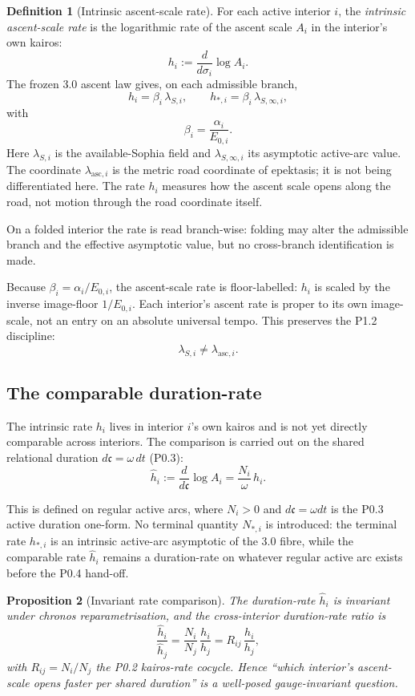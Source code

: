 \documentclass[11pt,a4paper]{article}
\theoremstyle{definition}
\newtheorem{definition}{Definition}[section]
\theoremstyle{plain}
\newtheorem{proposition}[definition]{Proposition}
\theoremstyle{remark}
\begin{document}
\begin{definition}[Intrinsic ascent-scale rate]\label{def:rate}
For each active interior \(i\), the \emph{intrinsic ascent-scale rate} is the
logarithmic rate of the ascent scale \(A_i\) in the interior's own kairos:
\[
\boxed{\;
h_i
:=
\frac{d}{d\sigma_i}\log A_i.
\;}
\]
The frozen 3.0 ascent law gives, on each admissible branch,
\[
\boxed{\;
h_i=\beta_i\,\lambda_{S,i},
\qquad
h_{*,i}=\beta_i\,\lambda_{S,\infty,i},
\;}
\]
with
\[
\beta_i=\frac{\alpha_i}{E_{0,i}}.
\]
Here \(\lambda_{S,i}\) is the available-Sophia field and
\(\lambda_{S,\infty,i}\) its asymptotic active-arc value. The coordinate
\(\lambda_{\mathrm{asc},i}\) is the metric road coordinate of epektasis; it is not
being differentiated here. The rate \(h_i\) measures how the ascent scale opens
along the road, not motion through the road coordinate itself.

On a folded interior the rate is read branch-wise: folding may alter the
admissible branch and the effective asymptotic value, but no cross-branch
identification is made.
\end{definition}

Because \(\beta_i=\alpha_i/E_{0,i}\), the ascent-scale rate is floor-labelled:
\(h_i\) is scaled by the inverse image-floor \(1/E_{0,i}\). Each interior's ascent
rate is proper to its own image-scale, not an entry on an absolute universal tempo.
This preserves the P1.2 discipline:
\[
\lambda_{S,i}\neq\lambda_{\mathrm{asc},i}.
\]

\subsection{The comparable duration-rate}

The intrinsic rate \(h_i\) lives in interior \(i\)'s own kairos and is not yet directly
comparable across interiors. The comparison is carried out on the shared relational
duration \(d\mathfrak c=\omega\,dt\) (P0.3):
\[
\boxed{\;
\hat h_i
:=
\frac{d}{d\mathfrak c}\log A_i
=
\frac{N_i}{\omega}\,h_i.
\;}
\]

This is defined on regular active arcs, where \(N_i>0\) and
\(d\mathfrak c=\omega dt\) is the P0.3 active duration one-form. No terminal
quantity \(N_{*,i}\) is introduced: the terminal rate \(h_{*,i}\) is an
intrinsic active-arc asymptotic of the 3.0 fibre, while the comparable rate
\(\hat h_i\) remains a duration-rate on whatever regular active arc exists before
the P0.4 hand-off.

\begin{proposition}[Invariant rate comparison]\label{prop:ratecompare}
The duration-rate \(\hat h_i\) is invariant under chronos reparametrisation, and
the cross-interior duration-rate ratio is
\[
\frac{\hat h_i}{\hat h_j}
=
\frac{N_i}{N_j}\,\frac{h_i}{h_j}
=
R_{ij}\,\frac{h_i}{h_j},
\]
with \(R_{ij}=N_i/N_j\) the P0.2 kairos-rate cocycle. Hence ``which interior's
ascent-scale opens faster per shared duration'' is a well-posed gauge-invariant
question.
\end{proposition}
\end{document}
